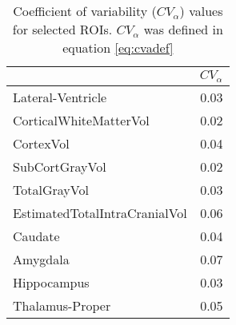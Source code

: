 \begin{table}
[]
\centering

\begin{tabular}{lr}
\toprule
{} &   $CV_{\alpha}$ \\
\midrule
Lateral-Ventricle             &  0.03 \\
CorticalWhiteMatterVol        &  0.02 \\
CortexVol                     &  0.04 \\
SubCortGrayVol                &  0.02 \\
TotalGrayVol                  &  0.03 \\
EstimatedTotalIntraCranialVol &  0.06 \\
Caudate                       &  0.04 \\
Amygdala                      &  0.07 \\
Hippocampus                   &  0.03 \\
Thalamus-Proper               &  0.05 \\
\bottomrule
\end{tabular}
\caption{Coefficient of variability ($CV_{\alpha}$) values for selected ROIs. $CV_{\alpha}$ was defined in equation \ref{eq:cvadef}}
\label{tab:cva} 
\end{table}